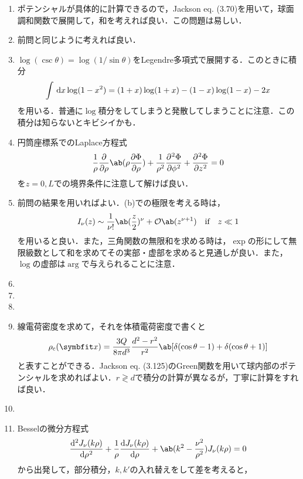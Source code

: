 \begin{enumerate}[label=\fbox{\textbf{\thesection.\arabic*}}]
  \item ポテンシャルが具体的に計算できるので，Jackson eq. (3.70)を用いて，球面調和関数で展開して，和を考えれば良い．この問題は易しい．
  \item 前問と同じように考えれば良い．
  \item $\log(\csc\theta) = \log(1/\sin\theta)$をLegendre多項式で展開する．このときに積分
    \begin{gather}
      \int \dl{x} \log(1 - x^2) = (1+x)\log(1+x) - (1-x)\log(1-x) - 2x
    \end{gather}
    を用いる．普通に$\log$積分をしてしまうと発散してしまうことに注意．この積分は知らないとキビシイかも．
  \item 円筒座標系でのLaplace方程式
    \begin{gather}
      \frac{1}{\rho}\diffp**{\rho}{\ab(\rho \diffp{\Phi}{\rho})} + \frac{1}{\rho^2}\diffp[2]{\Phi}{\phi} + \diffp[2]{\Phi}{z} = 0
   \end{gather}
   を$z = 0, L$での境界条件に注意して解けば良い．
 \item 前問の結果を用いればよい．(b)での極限を考える時は，
   \begin{gather}
     I_\nu(z) \sim \frac{1}{\nu !} \ab(\frac{z}{2})^\nu + \order{z^{\nu+1}} \qq \text{if} \qq z \ll 1
   \end{gather}
   を用いると良い．また，三角関数の無限和を求める時は，$\exp$の形にして無限級数として和を求めてその実部・虚部を求めると見通しが良い．また，$\log$の虚部は$\arg$で与えられることに注意．
 \item %
 \item %
 \item %
 \item %
  線電荷密度を求めて，それを体積電荷密度で書くと
  \begin{gather}
    \rho_\mr{c} (\bs{x}) = \frac{3Q}{8\pi d^3} \frac{d^2 - r^2}{r^2} \ab[\delta(\cos\theta - 1) + \delta(\cos\theta + 1)]
  \end{gather}
  と表すことができる．Jackson eq. (3.125)のGreen関数を用いて球内部のポテンシャルを求めればよい．$r \gtrless d$で積分の計算が異なるが，丁寧に計算をすれば良い．
 \item %
 \item %
   Besselの微分方程式
   \begin{gather}
     \diff[2]{J_\nu(k\rho)}{\rho} + \frac{1}{\rho} \diff{J_\nu(k\rho)}{\rho} + \ab(k^2 - \frac{\nu^2}{\rho^2})J_\nu(k\rho)  = 0
   \end{gather}
   から出発して，部分積分，$k, k'$の入れ替えをして差を考えると，

\end{enumerate}
